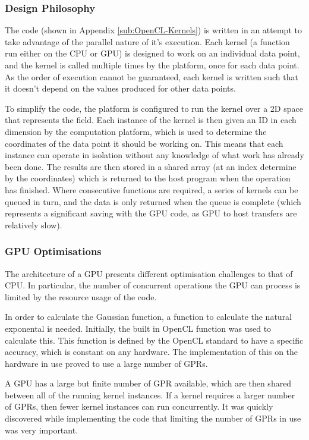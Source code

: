 \documentclass[10pt]{article}
\begin{document}
\subsubsection{Design Philosophy}

The code (shown in Appendix \ref{sub:OpenCL-Kernels}) is written in an attempt
to take advantage of the parallel nature of it's execution. Each kernel (a
function run either on the CPU or GPU) is designed to work on an
individual data point, and the kernel is called multiple times by the platform,
once for each data point. As the order of execution cannot be guaranteed, each
kernel is written such that it doesn't depend on the values produced for other
data points.

To simplify the code, the platform is configured to run the kernel over a 2D
space that represents the field. Each instance of the kernel is then given an ID
in each dimension by the computation platform, which is used to determine the
coordinates of the data point it should be working on. This means that each
instance can operate in isolation without any knowledge of what work has already
been done. The results are then stored in a shared array (at an index determine
by the coordinates) which is returned to the host program when the operation has
finished. Where consecutive functions are required, a series of kernels can be
queued in turn, and the data is only returned when the queue is complete (which
represents a significant saving with the GPU code, as GPU to host transfers are
relatively slow).

\subsubsection{GPU Optimisations}

The architecture of a GPU presents different optimisation challenges to that of
CPU. In particular, the number of concurrent operations the GPU can process is
limited by the resource usage of the code.

In order to calculate the Gaussian function, a function to calculate the natural
exponental is needed. Initially, the built in OpenCL function was used to
calculate this. This function is defined by the OpenCL standard to have a
specific accuracy, which is constant on any hardware. The implementation of this
on the hardware in use proved to use a large number of GPRs.

A GPU has a large but finite number of GPR available, which are then
shared between all of the running kernel instances. If a kernel requires a
larger number of GPRs, then fewer kernel instances can run concurrently. It
was quickly discovered while implementing the code that limiting the number of
GPRs in use was very important.
\end{document}
